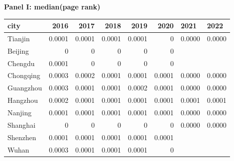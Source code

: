 \textbf{Panel I: median(page rank)}\\
\begin{tabular}{lrrrrrll}
\hline
 city      &   2016 &   2017 &   2018 &   2019 &   2020 & 2021   & 2022   \\
\hline
 Tianjin   & 0.0001 & 0.0001 & 0.0001 & 0.0001 & 0      & 0.0000 & 0.0000 \\
 Beijing   & 0      & 0      & 0      & 0      & 0      &        &        \\
 Chengdu   & 0.0001 & 0      & 0      & 0      & 0      &        &        \\
 Chongqing & 0.0003 & 0.0002 & 0.0001 & 0.0001 & 0.0001 & 0.0000 & 0.0000 \\
 Guangzhou & 0.0003 & 0.0001 & 0.0001 & 0.0002 & 0.0001 & 0.0000 & 0.0000 \\
 Hangzhou  & 0.0002 & 0.0001 & 0.0001 & 0.0001 & 0.0001 & 0.0001 & 0.0001 \\
 Nanjing   & 0.0001 & 0.0001 & 0.0001 & 0.0001 & 0.0001 & 0.0000 & 0.0000 \\
 Shanghai  & 0      & 0      & 0      & 0      & 0      & 0.0000 & 0.0000 \\
 Shenzhen  & 0.0001 & 0.0001 & 0.0001 & 0.0001 & 0.0001 &        &        \\
 Wuhan     & 0.0003 & 0.0001 & 0.0001 & 0.0001 & 0      &        &        \\
\hline
\end{tabular}

